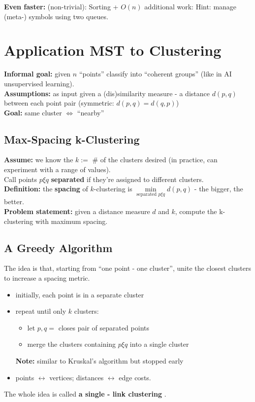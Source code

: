 \documentclass{scrartcl}
\begin{document}
{\bf Even faster: } (non-trivial): Sorting + $O(n)$ additional work: Hint:
manage (meta-) symbols using two queues.

\section{Application MST to Clustering}
\label{sec:8-1} {\bf Informal goal: } given $n$ ``points'' classify into
``coherent groups''
(like in AI unsupervised learning). \\
{\bf Assumptions: } as input given a (dis)similarity measure - a distance $d(p,
q)$ between each point pair (symmetric: $d(p,q) = d(q,p)$)\\

{\bf Goal: } same cluster $\Leftrightarrow$ ``nearby''
\subsection{Max-Spacing k-Clustering}
\label{sec:8-1-1} {\bf Assume: } we know the $k := $ \# of the clusters desired
(in practice, can
experiment with a range of values).\\
Call points $p \xi q$ {\bf separated } if they're assigned to different
clusters. \\
{\bf Definition: } the {\bf spacing } of $k$-clustering is $\min
\limits_{\text{separated } p \xi q} d(p, q)$ - the bigger, the better.\\

{\bf Problem statement: } given a distance measure $d$ and $k$, compute the
k-clustering with maximum spacing.
\subsection{A Greedy Algorithm}
\label{sec:8-1-2}
The idea is that, starting from ``one point - one cluster'', unite the closest
clusters to increase a spacing metric.\\
\begin{itemize}
\item initially, each point is in a separate cluster
\item repeat until only $k$ clusters:
  \begin{itemize}
  \item let $p, q = $ closes pair of separated points
  \item merge the clusters containing $p \xi q$ into a single cluster
  \end{itemize} {\bf Note: } similar to Kruskal's algorithm but stopped early
\item points $\leftrightarrow$ vertices; distances $\leftrightarrow$ edge costs.
\end{itemize}
The whole idea is called {\bf a single - link clustering }.
\end{document}
